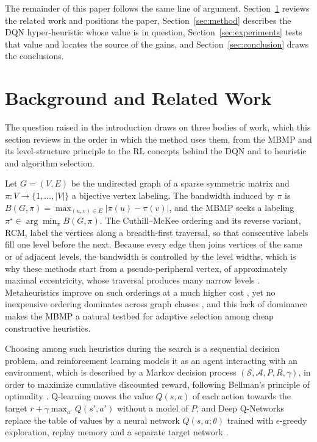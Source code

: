 \documentclass[runningheads]{llncs}
\begin{document}
The remainder of this paper follows the same line of argument. Section~\ref{sec:background} reviews the related work and positions the paper, Section~\ref{sec:method} describes the DQN hyper-heuristic whose value is in question, Section~\ref{sec:experiments} tests that value and locates the source of the gains, and Section~\ref{sec:conclusion} draws the conclusions.

\section{Background and Related Work}
\label{sec:background}

The question raised in the introduction draws on three bodies of work, which this section reviews in the order in which the method uses them, from the MBMP and its level-structure principle to the RL concepts behind the DQN and to heuristic and algorithm selection.

Let $G=(V,E)$ be the undirected graph of a sparse symmetric matrix and $\pi: V \rightarrow \{1,\ldots,|V|\}$ a bijective vertex labeling. The bandwidth induced by $\pi$ is $B(G,\pi)=\max_{(u,v)\in E} |\pi(u)-\pi(v)|$, and the MBMP seeks a labeling $\pi^\star \in \arg\min_{\pi} B(G,\pi)$. The Cuthill--McKee ordering \cite{cuthill1969} and its reverse variant, RCM, label the vertices along a breadth-first traversal, so that consecutive labels fill one level before the next. Because every edge then joins vertices of the same or of adjacent levels, the bandwidth is controlled by the level widths, which is why these methods start from a pseudo-peripheral vertex, of approximately maximal eccentricity, whose traversal produces many narrow levels \cite{gibbs1976}. Metaheuristics improve on such orderings at a much higher cost \cite{marti2001,pinana2004,rodriguez2008,mladenovic2010}, yet no inexpensive ordering dominates across graph classes \cite{gonzaga2025}, and this lack of dominance makes the MBMP a natural testbed for adaptive selection among cheap constructive heuristics.

Choosing among such heuristics during the search is a sequential decision problem, and reinforcement learning models it as an agent interacting with an environment, which is described by a Markov decision process $(\mathcal{S},\mathcal{A},P,R,\gamma)$, in order to maximize cumulative discounted reward, following Bellman's principle of optimality \cite{bellman1957}. Q-learning \cite{watkins1992} moves the value $Q(s,a)$ of each action towards the target $r+\gamma\max_{a'}Q(s',a')$ without a model of $P$, and Deep Q-Networks replace the table of values by a neural network $Q(s,a;\theta)$ trained with $\epsilon$-greedy exploration, replay memory and a separate target network \cite{mnih2015}.
\end{document}
